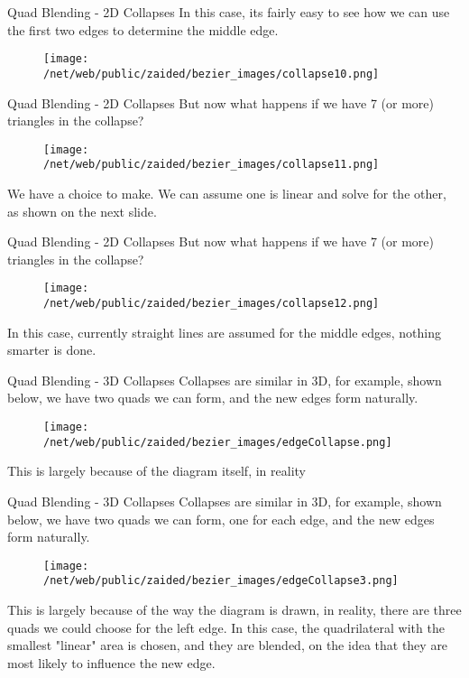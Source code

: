 \documentclass[12pt]{beamer}
\begin{document}
\begin{frame}{Quad Blending - 2D Collapses}
In this case, its fairly easy to see how we can use the first two edges to determine the middle edge.
\begin{figure}
  \centering
  \texttt{[image: /net/web/public/zaided/bezier\_images/collapse10.png]} 
\end{figure}

\end{frame}
\begin{frame}{Quad Blending - 2D Collapses}
But now what happens if we have 7 (or more) triangles in the collapse?
\begin{figure}
  \centering
  \texttt{[image: /net/web/public/zaided/bezier\_images/collapse11.png]} 
\end{figure}
We have a choice to make.  We can assume one is linear and solve for the other, as shown on the next slide.
\end{frame}
\begin{frame}{Quad Blending - 2D Collapses}
But now what happens if we have 7 (or more) triangles in the collapse?
\begin{figure}
  \centering
  \texttt{[image: /net/web/public/zaided/bezier\_images/collapse12.png]} 
\end{figure}
In this case, currently straight lines are assumed for the middle edges, nothing smarter is done.
\end{frame}

\begin{frame}{Quad Blending - 3D Collapses}
Collapses are similar in 3D, for example, shown below, we have two quads we can form, and the new edges form naturally.
\begin{figure}
  \centering
  \texttt{[image: /net/web/public/zaided/bezier\_images/edgeCollapse.png]} 
\end{figure}
This is largely because of the diagram itself, in reality
\end{frame}
\begin{frame}{Quad Blending - 3D Collapses}
Collapses are similar in 3D, for example, shown below, we have two quads we can form, one for each edge, and the new edges form naturally.
\begin{figure}
  \centering
  \texttt{[image: /net/web/public/zaided/bezier\_images/edgeCollapse3.png]} 
\end{figure}
This is largely because of the way the diagram is drawn, in reality, there are three quads we could choose for the left edge. In this case, the quadrilateral with the smallest "linear" area is chosen, and they are blended, on the idea that they are most likely to influence the new edge.
\end{frame}
\end{document}
